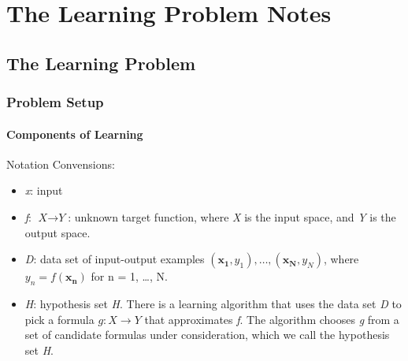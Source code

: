 %
\chapter{The Learning Problem Notes}

\section{The Learning Problem}
\subsection{Problem Setup}
\subsubsection{Components of Learning}
Notation Convensions:
\begin{itemize}[noitemsep,topsep=0pt]
    \itemsep-1em
    \item \textit{x}: input\\
    \item \textit{f}: $\textit{X} \rightarrow \textit{Y}$: unknown target function, where \textit{X} is the input space, and \textit{Y} is the output space.\\
    \item \textit{D}: data set of input-output examples $(\mathbf{x_1}, y_1), \ldots, (\mathbf{x_N}, y_N)$, where $y_n = f(\mathbf{x_n})$ for n = 1, \ldots, N. \\
    \item \textit{H}: hypothesis set \textit{H}. There is a learning algorithm that uses the data set \textit{D} to pick a formula $\textit{g}: \textit{X} \rightarrow \textit{Y}$ that approximates \textit{f}. The algorithm chooses \textit{g} from a set of candidate formulas under consideration, which we call the hypothesis set \textit{H}.
\end{itemize}


